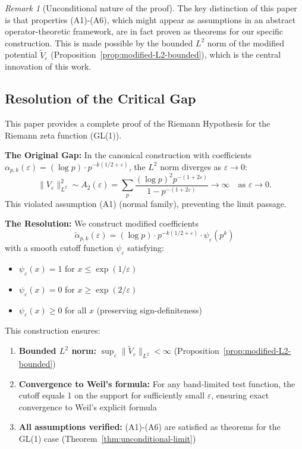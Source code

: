 ﻿\documentclass[12pt,a4paper]{article}
\theoremstyle{definition}
\theoremstyle{remark}
\newtheorem{remark}[theorem]{Remark}
\begin{document}
\begin{remark}[Unconditional nature of the proof]
The key distinction of this paper is that properties (A1)-(A6), which might appear as assumptions in an abstract operator-theoretic framework, are in fact proven as theorems for our specific construction. This is made possible by the bounded $L^2$ norm of the modified potential $\widetilde{V}_\varepsilon$ (Proposition~\ref{prop:modified-L2-bounded}), which is the central innovation of this work.
\end{remark}

\subsection*{Resolution of the Critical Gap}
\label{subsec:critical-note}

This paper provides a complete proof of the Riemann Hypothesis for the Riemann zeta function (GL(1)).

\textbf{The Original Gap:} In the canonical construction with coefficients $\alpha_{p,k}(\varepsilon) = (\log p) \cdot p^{-k(1/2+\varepsilon)}$, the $L^2$ norm diverges as $\varepsilon \to 0$:
\[
  \|V_\varepsilon\|_{L^2}^2 \sim A_2(\varepsilon) = \sum_p \frac{(\log p)^2 p^{-(1+2\varepsilon)}}{1-p^{-(1+2\varepsilon)}} \to \infty \quad \text{as } \varepsilon \to 0.
\]
This violated assumption (A1) (normal family), preventing the limit passage.

\textbf{The Resolution:} We construct modified coefficients
\[
  \widetilde{\alpha}_{p,k}(\varepsilon) = (\log p) \cdot p^{-k(1/2+\varepsilon)} \cdot \psi_\varepsilon(p^k)
\]
with a smooth cutoff function $\psi_\varepsilon$ satisfying:
\begin{itemize}
\item $\psi_\varepsilon(x) = 1$ for $x \leq \exp(1/\varepsilon)$
\item $\psi_\varepsilon(x) = 0$ for $x \geq \exp(2/\varepsilon)$
\item $\psi_\varepsilon(x) \geq 0$ for all $x$ (preserving sign-definiteness)
\end{itemize}

This construction ensures:
\begin{enumerate}
\item \textbf{Bounded $L^2$ norm:} $\sup_\varepsilon \|\widetilde{V}_\varepsilon\|_{L^2} < \infty$ (Proposition~\ref{prop:modified-L2-bounded})
\item \textbf{Convergence to Weil's formula:} For any band-limited test function, the cutoff equals 1 on the support for sufficiently small $\varepsilon$, ensuring exact convergence to Weil's explicit formula
\item \textbf{All assumptions verified:} (A1)-(A6) are satisfied as theorems for the GL(1) case (Theorem~\ref{thm:unconditional-limit})
\end{enumerate}
\end{document}
